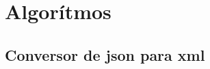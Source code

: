 %

\chapter{Algorítmos}

\section{Conversor de \acrshort{json} para \acrshort{xml}}\label{exem:convXML}
